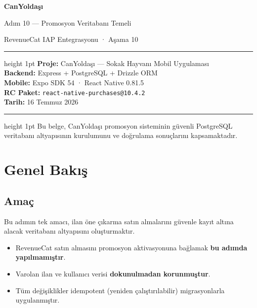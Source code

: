 \documentclass[12pt,a4paper]{article}
\begin{document}
\begin{titlepage}
  \centering
  \vspace*{2.5cm}
  {\Huge\bfseries\color{primary} CanYoldaşı\par}
  \vspace{0.5cm}
  {\Large Adım 10 — Promosyon Veritabanı Temeli\par}
  \vspace{0.3cm}
  {\normalsize RevenueCat IAP Entegrasyonu · Aşama 10\par}
  \vspace{1.5cm}
  \hrule height 1pt
  \vspace{0.4cm}
  {\normalsize
    \textbf{Proje:}      CanYoldaşı — Sokak Hayvanı Mobil Uygulaması\\[4pt]
    \textbf{Backend:}    Express + PostgreSQL + Drizzle ORM\\[4pt]
    \textbf{Mobile:}     Expo SDK 54 · React Native 0.81.5\\[4pt]
    \textbf{RC Paket:}   \texttt{react-native-purchases@10.4.2}\\[4pt]
    \textbf{Tarih:}      16 Temmuz 2026
  }
  \vspace{0.4cm}
  \hrule height 1pt
  \vfill
  {\small\color{codegray}
    Bu belge, CanYoldaşı promosyon sisteminin güvenli PostgreSQL\\
    veritabanı altyapısının kurulumunu ve doğrulama sonuçlarını kapsamaktadır.
  }
\end{titlepage}

\tableofcontents
\newpage

\section{Genel Bakış}

\subsection{Amaç}

Bu adımın tek amacı, ilan öne çıkarma satın almalarını güvenle kayıt altına
alacak veritabanı altyapısını oluşturmaktır.

\begin{itemize}[leftmargin=1.5em]
  \item RevenueCat satın almasını promosyon aktivasyonuna bağlamak \textbf{bu adımda yapılmamıştır}.
  \item Varolan ilan ve kullanıcı verisi \textbf{dokunulmadan korunmuştur}.
  \item Tüm değişiklikler idempotent (yeniden çalıştırılabilir) migrasyonlarla uygulanmıştır.
\end{itemize}
\end{document}

